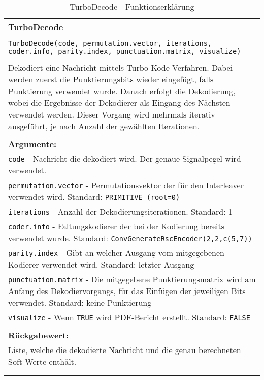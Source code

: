 \begin{longtable}{|p{\textwidth}|}
\hline
\rowcolor{lightblue}TurboDecode\\
\hline
\\
\texttt{TurboDecode(code, permutation.vector, iterations, coder.info, parity.index, punctuation.matrix, visualize)}\\
\\
Dekodiert eine Nachricht mittels Turbo-Kode-Verfahren. Dabei werden zuerst die Punktierungsbits wieder eingefügt, falls Punktierung verwendet wurde. Danach erfolgt die Dekodierung, wobei die Ergebnisse der Dekodierer als Eingang des Nächsten verwendet werden. Dieser Vorgang wird mehrmals iterativ ausgeführt, je nach Anzahl der gewählten Iterationen.\\
\\
\textbf{Argumente:}\\
\texttt{code} - Nachricht die dekodiert wird. Der genaue Signalpegel wird verwendet.\\
\texttt{permutation.vector} - Permutationsvektor der für den Interleaver verwendet wird. Standard: \texttt{PRIMITIVE (root=0)}\\
\texttt{iterations} - Anzahl der Dekodierungsiterationen. Standard: 1\\
\texttt{coder.info} - Faltungskodierer der bei der Kodierung bereits verwendet wurde. Standard: \texttt{ConvGenerateRscEncoder(2,2,c(5,7))}\\
\texttt{parity.index} - Gibt an welcher Ausgang vom mitgegebenen Kodierer verwendet wird. Standard: letzter Ausgang\\
\texttt{punctuation.matrix} - Die mitgegebene Punktierungsmatrix wird am Anfang des Dekodiervorgangs,  für das Einfügen der jeweiligen Bits verwendet. Standard: keine Punktierung\\
\texttt{visualize} - Wenn \texttt{TRUE} wird PDF-Bericht erstellt. Standard: \texttt{FALSE}\\
\\
\textbf{Rückgabewert:}\\
Liste, welche die dekodierte Nachricht und die genau berechneten Soft-Werte enthält.\\
\\
\hline
\caption[TurboDecode]{TurboDecode - Funktionserklärung}
\end{longtable}